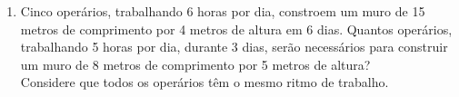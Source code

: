 \documentclass[a4paper,14pt]{article}
\begin{document}
\begin{multicols}{2}
\begin{enumerate}
			\item Cinco operários, trabalhando 6 horas por dia, constroem um muro de 15 metros de comprimento por 4 metros de altura em 6 dias. Quantos operários, trabalhando 5 horas por dia, durante 3 dias, serão necessários para construir um muro de 8 metros de comprimento por 5 metros de altura?\\
			Considere que todos os operários têm o mesmo ritmo de trabalho. \\\\\\\\\\\\\\\\\\\\\\\\\\\\\\\\\\\\\\
		\end{enumerate}
	$~$ \\ $~$ \\ $~$ \\ $~$ \\ $~$ \\ $~$ \\ $~$ \\ $~$ \\ $~$ \\
    \end{multicols}
\end{document}

